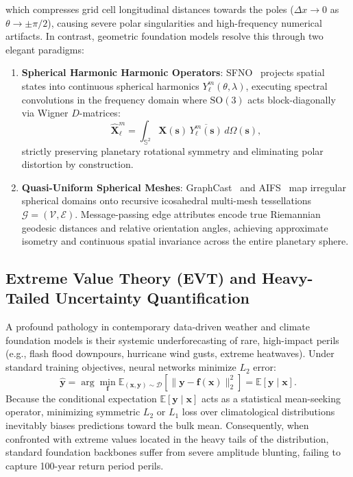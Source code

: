 which compresses grid cell longitudinal distances towards the poles ($\Delta x \to 0$ as $\theta \to \pm \pi/2$), causing severe polar singularities and high-frequency numerical artifacts. In contrast, geometric foundation models resolve this through two elegant paradigms:
\begin{enumerate}
    \item \textbf{Spherical Harmonic Harmonic Operators}: SFNO~\cite{bonev2023sfno} projects spatial states into continuous spherical harmonics $Y_\ell^m(\theta, \lambda)$, executing spectral convolutions in the frequency domain where $\mathrm{SO}(3)$ acts block-diagonally via Wigner $D$-matrices:
    \begin{equation}
        \widehat{\mathbf{X}}_\ell^m = \int_{\mathbb{S}^2} \mathbf{X}(\mathbf{s}) \, \overline{Y_\ell^m(\mathbf{s})} \, d\Omega(\mathbf{s}),
    \end{equation}
    strictly preserving planetary rotational symmetry and eliminating polar distortion by construction.
    \item \textbf{Quasi-Uniform Spherical Meshes}: GraphCast~\cite{lam2023graphcast} and AIFS~\cite{lang2024aifs} map irregular spherical domains onto recursive icosahedral multi-mesh tessellations $\mathcal{G} = (\mathcal{V}, \mathcal{E})$. Message-passing edge attributes encode true Riemannian geodesic distances and relative orientation angles, achieving approximate isometry and continuous spatial invariance across the entire planetary sphere.
\end{enumerate}

\subsection{Extreme Value Theory (EVT) and Heavy-Tailed Uncertainty Quantification}
\label{sec:extreme_value_theory}
A profound pathology in contemporary data-driven weather and climate foundation models is their systemic underforecasting of rare, high-impact perils (e.g., flash flood downpours, hurricane wind gusts, extreme heatwaves). Under standard training objectives, neural networks minimize $L_2$ error:
\begin{equation}
    \hat{\mathbf{y}} = \arg\min_{\mathbf{f}} \mathbb{E}_{(\mathbf{x}, \mathbf{y}) \sim \mathcal{D}}\left[ \|\mathbf{y} - \mathbf{f}(\mathbf{x})\|_2^2 \right] = \mathbb{E}[\mathbf{y} \mid \mathbf{x}].
\end{equation}
Because the conditional expectation $\mathbb{E}[\mathbf{y} \mid \mathbf{x}]$ acts as a statistical mean-seeking operator, minimizing symmetric $L_2$ or $L_1$ loss over climatological distributions inevitably biases predictions toward the bulk mean. Consequently, when confronted with extreme values located in the heavy tails of the distribution, standard foundation backbones suffer from severe amplitude blunting, failing to capture 100-year return period perils.

